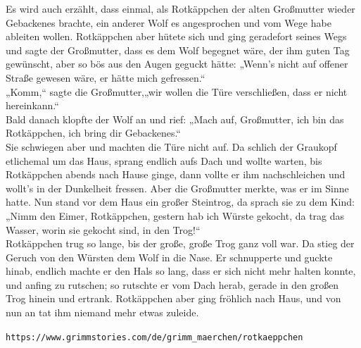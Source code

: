 \documentclass[12pt,a4paper]{article}
\begin{document}
Es wird auch erzählt, dass einmal, als Rotkäppchen der alten Großmutter wieder Gebackenes brachte, ein anderer Wolf es angesprochen und vom Wege habe ableiten wollen. Rotkäppchen aber hütete sich und ging geradefort seines Wegs und sagte der Großmutter, dass es dem Wolf begegnet wäre, der ihm guten Tag gewünscht, aber so bös aus den Augen geguckt hätte: „Wenn's nicht auf offener Straße gewesen wäre, er hätte mich gefressen.“\\

„Komm,“ sagte die Großmutter,„wir wollen die Türe verschließen, dass er nicht hereinkann.“\\

Bald danach klopfte der Wolf an und rief: „Mach auf, Großmutter, ich bin das Rotkäppchen, ich bring dir Gebackenes.“\\

Sie schwiegen aber und machten die Türe nicht auf. Da schlich der Graukopf etlichemal um das Haus, sprang endlich aufs Dach und wollte warten, bis Rotkäppchen abends nach Hause ginge, dann vollte er ihm nachschleichen und wollt's in der Dunkelheit fressen. Aber die Großmutter merkte, was er im Sinne hatte. Nun stand vor dem Haus ein großer Steintrog, da sprach sie zu dem Kind: „Nimm den Eimer, Rotkäppchen, gestern hab ich Würste gekocht, da trag das Wasser, worin sie gekocht sind, in den Trog!“\\

Rotkäppchen trug so lange, bis der große, große Trog ganz voll war. Da stieg der Geruch von den Würsten dem Wolf in die Nase. Er schnupperte und guckte hinab, endlich machte er den Hals so lang, dass er sich nicht mehr halten konnte, und anfing zu rutschen; so rutschte er vom Dach herab, gerade in den großen Trog hinein und ertrank. Rotkäppchen aber ging fröhlich nach Haus, und von nun an tat ihm niemand mehr etwas zuleide.

\vspace{2em}

\texttt{https://www.grimmstories.com/de/grimm\_maerchen/rotkaeppchen}
\end{document}
